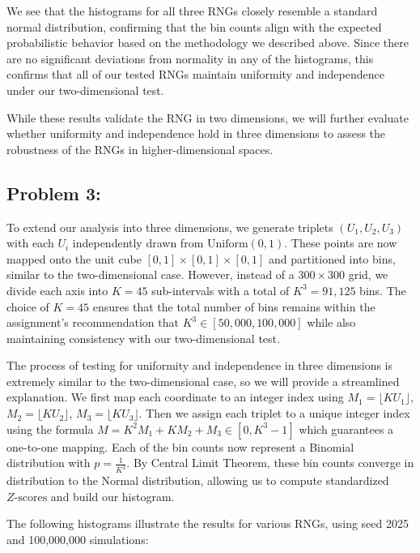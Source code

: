 \documentclass{article}
\begin{document}
We see that the histograms for all three RNGs closely resemble a standard normal distribution, confirming that the bin counts align with the expected probabilistic behavior based on the methodology we described above. Since there are no significant deviations from normality in any of the histograms, this confirms that all of our tested RNGs maintain uniformity and independence under our two-dimensional test.

While these results validate the RNG in two dimensions, we will further evaluate whether uniformity and independence hold in three dimensions to assess the robustness of the RNGs in higher-dimensional spaces.

\subsection*{Problem 3:}
\hspace{1.5em}To extend our analysis into three dimensions, we generate triplets \((U_1, U_2, U_3)\) with each \(U_i\) independently drawn from \(\text{Uniform}(0, 1)\). These points are now mapped onto the unit cube \([0, 1] \times [0, 1] \times [0, 1]\) and partitioned into bins, similar to the two-dimensional case. However, instead of a \(300 \times 300\) grid, we divide each axis into \(K = 45\) sub-intervals with a total of \(K^3 = 91,125\) bins. The choice of \(K = 45\) ensures that the total number of bins remains within the assignment's recommendation that  \(K^3 \in [50,000, 100,000]\) while also maintaining consistency with our two-dimensional test.

The process of testing for uniformity and independence in three dimensions is extremely similar to the two-dimensional case, so we will provide a streamlined explanation. We first map each coordinate to an integer index using \(M_1 = \lfloor KU_1\rfloor\),  \(M_2 = \lfloor KU_2\rfloor\),  \(M_3 = \lfloor KU_3\rfloor\). Then we assign each triplet to a unique integer index using the formula \(M = K^2M_1 + KM_2 + M_3 \in [0, K^3 - 1]\) which guarantees a one-to-one mapping. Each of the bin counts now represent a Binomial distribution with \(p = \frac{1}{K^3}\). By Central Limit Theorem, these bin counts converge in distribution to the Normal distribution, allowing us to compute standardized \(Z\text{-scores}\) and build our histogram.

The following histograms illustrate the results for various RNGs, using seed 2025 and 100,000,000 simulations:
\end{document}
